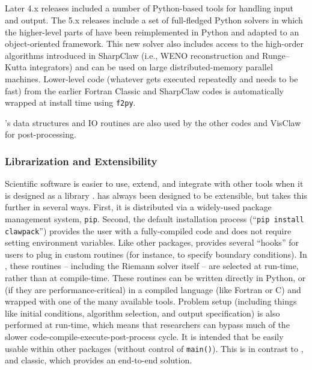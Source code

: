 %
%
%

\subsection{\pyclaw} \label{sec:pyclaw}

Later 4.x releases included a number of Python-based tools for handling
\clawpack input and output.  The 5.x releases include a set of full-fledged Python
solvers in which the higher-level parts of \clawpack have been reimplemented in
Python and adapted to an object-oriented framework.  This new solver also
includes access to the high-order algorithms introduced in SharpClaw (i.e.,
WENO reconstruction and Runge--Kutta integrators) and can be used on large
distributed-memory parallel machines.  Lower-level code (whatever gets executed
repeatedly and needs to be fast) from the earlier Fortran Classic and SharpClaw
codes is automatically wrapped at install time using \texttt{f2py}.

\pyclaw's data structures and IO routines are also used by the other \clawpack
codes and VisClaw for post-processing.

\subsubsection{Librarization and Extensibility}
Scientific software is easier to use, extend, and integrate with other tools when
it is designed as a library \cite{Brown:2015cj}.  \clawpack has always been designed
to be extensible, but \pyclaw takes this further in several ways.  First, it is
distributed via a widely-used package management system, \texttt{pip}.
Second, the default installation process (``\texttt{pip install clawpack}'')
provides the user with a fully-compiled code and does not require setting environment
variables.  Like other \clawpack packages, \pyclaw provides several ``hooks'' for users
to plug in custom routines (for instance, to specify boundary conditions).
In \pyclaw, these routines -- including the Riemann solver itself -- are selected at
run-time, rather than at compile-time.  These routines can be written directly in
Python, or (if they are performance-critical) in a compiled language (like Fortran or C)
and wrapped with one of the many available tools.  Problem setup (including things like
initial conditions, algorithm selection, and output specification) is also
performed at run-time, which means that researchers can bypass much of the slower
code-compile-execute-post-process cycle.
It is intended that \pyclaw be easily usable within other packages (without control of \texttt{main()}).  This is in contrast to \amrclaw, \geoclaw and classic, which provides an end-to-end solution.

